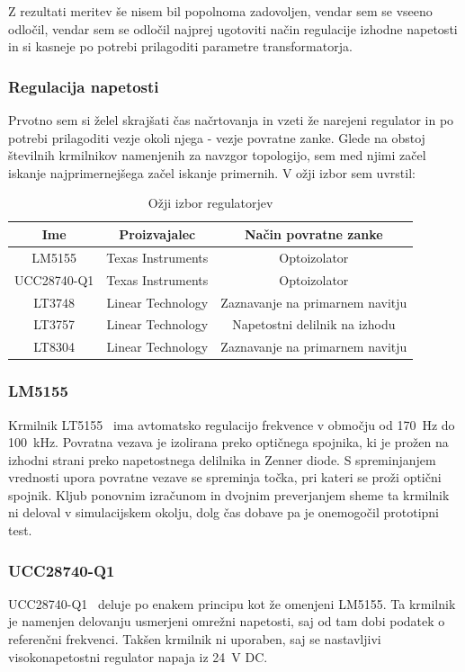 \documentclass[a4paper,twoside,openright,12pt,Slovene]{book}
\begin{document}
Z rezultati meritev še nisem bil popolnoma zadovoljen, vendar sem se vseeno odločil, vendar sem se odločil najprej ugotoviti način regulacije izhodne napetosti in si kasneje po potrebi prilagoditi parametre transformatorja. 

	\subsubsection{Regulacija napetosti} \label{RegulacijaNapetosti}
	Prvotno sem si želel skrajšati čas načrtovanja in vzeti že narejeni regulator in po potrebi prilagoditi vezje okoli njega - vezje povratne zanke. Glede na obstoj številnih krmilnikov namenjenih za navzgor topologijo, sem med njimi začel iskanje najprimernejšega začel iskanje primernih. V ožji izbor sem uvrstil:
	
\begin{table}[h!]
\centering
\begin{tabular}{||c | c |c||}
\hline
Ime & Proizvajalec & Način povratne zanke \\[0.5ex]
\hline\hline
LM5155 & Texas Instruments & Optoizolator \\
UCC28740-Q1 & Texas Instruments & Optoizolator \\
LT3748 & Linear Technology & Zaznavanje na primarnem navitju \\
LT3757 & Linear Technology & Napetostni delilnik na izhodu \\
LT8304 & Linear Technology & Zaznavanje na primarnem navitju \\ [1ex]

\hline
\end{tabular}
\caption{Ožji izbor regulatorjev}
\end{table}

	\subsubsection{LM5155} \label{LM5155}
Krmilnik LT5155~\cite{TI:LT5155} ima avtomatsko regulacijo frekvence v območju od \SI{170}{\hertz} do \SI{100}{\kilo\hertz}. Povratna vezava je izolirana preko optičnega spojnika, ki je prožen na izhodni strani preko napetostnega delilnika in Zenner diode. S spreminjanjem vrednosti upora povratne vezave se spreminja točka, pri kateri se proži optični spojnik. Kljub ponovnim izračunom in dvojnim preverjanjem sheme ta krmilnik ni deloval v simulacijskem okolju, dolg čas dobave pa je onemogočil prototipni test.


	\subsubsection{UCC28740-Q1} \label{UCC28740-Q1}
UCC28740-Q1~\cite{TI:UCC28740} deluje po enakem principu kot že omenjeni LM5155. Ta krmilnik je namenjen delovanju usmerjeni omrežni napetosti, saj od tam dobi podatek o referenčni frekvenci. Takšen krmilnik ni uporaben, saj se nastavljivi visokonapetostni regulator napaja iz \SI{24}{\volt} DC. 
\end{document}
